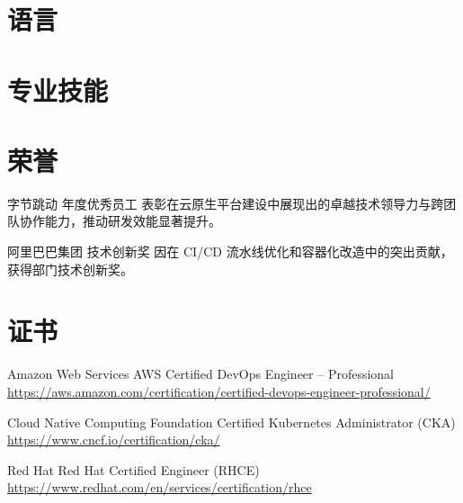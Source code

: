 \documentclass[a4paper, serif, 10pt]{moderncv}
\begin{document}
\section{语言}

\section{专业技能}

\section{荣誉}

        {字节跳动}
        {年度优秀员工}
        {}
        {}
        {表彰在云原生平台建设中展现出的卓越技术领导力与跨团队协作能力，推动研发效能显著提升。}

        {阿里巴巴集团}
        {技术创新奖}
        {}
        {}
        {因在 CI/CD 流水线优化和容器化改造中的突出贡献，获得部门技术创新奖。}
\section{证书}

        {Amazon Web Services}
        {AWS Certified DevOps Engineer – Professional}
        {\url{https://aws.amazon.com/certification/certified-devops-engineer-professional/}}
        {}
        {}

        {Cloud Native Computing Foundation}
        {Certified Kubernetes Administrator (CKA)}
        {\url{https://www.cncf.io/certification/cka/}}
        {}
        {}

        {Red Hat}
        {Red Hat Certified Engineer (RHCE)}
        {\url{https://www.redhat.com/en/services/certification/rhce}}
        {}
        {}
\end{document}
